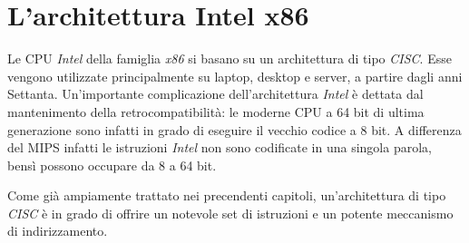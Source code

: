 \documentclass[class=book, crop=false]{standalone}
\begin{document}
\chapter{L'architettura Intel x86}
Le CPU \emph{Intel} della famiglia \emph{x86} si basano su un architettura di tipo \emph{CISC}. Esse vengono utilizzate principalmente su laptop, desktop e server, a partire dagli anni Settanta. Un'importante complicazione dell'architettura \emph{Intel} è dettata dal mantenimento della retrocompatibilità: le moderne CPU a 64 bit di ultima generazione sono infatti in grado di eseguire il vecchio codice a 8 bit. A differenza del MIPS infatti le istruzioni \emph{Intel} non sono codificate in una singola parola, bensì possono occupare da 8 a 64 bit.

Come già ampiamente trattato nei precendenti capitoli, un'architettura di tipo \emph{CISC} è in grado di offrire un notevole set di istruzioni e un potente meccanismo di indirizzamento.
\end{document}
